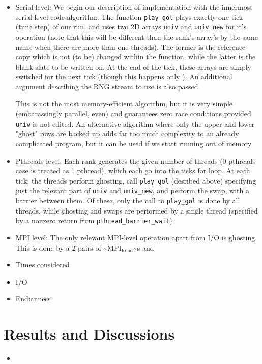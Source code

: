 \documentclass[letter,11pt]{article}
\begin{document}
\begin{itemize}
\item Serial level: We begin our description of implementation with the innermost serial level code algorithm. The function \verb~play_gol~ plays exactly one tick (time step) of our run, and uses two 2D arrays \verb~univ~ and \verb~univ_new~ for it's operation (note that this will be different than the rank's array's by the same name when there are more than one threads). The former is the reference copy which is not (to be) changed within the function, while the latter is the blank slate to be written on. At the end of the tick, these arrays are simply switched for the next tick (though this happens only ). An additional argument describing the RNG stream to use is also passed.

This is not the most memory-efficient algorithm, but it is very simple (embarassingly parallel, even) and guarantees zero race conditions provided \verb~univ~ is not edited. An alternative algorithm where only the upper and lower "ghost" rows are backed up adds far too much complexity to an already complicated program, but it can be used if we start running out of memory.
\item Pthreads level: Each rank generates the given number of threads (0 pthreads case is treated as 1 pthread), which each go into the ticks for loop. At each tick, the threads perform ghosting, call \verb~play_gol~ (desribed above) specifying just the relevant part of \verb~univ~ and \verb~univ_new~, and perform the swap, with a barrier between them. Of these, only the call to \verb~play_gol~ is done by all threads, while ghosting and swaps are performed by a single thread (specified by a nonzero return from \verb~pthread_barrier_wait~).
\item MPI level: The only relevant MPI-level operation apart from I/O is ghosting. This is done by a 2 pairs of \textasciitilde{}MPI$_{\text{Isend}}$\textasciitilde{}s and
\item Times considered
\item I/O
\item Endianness
\end{itemize}

\section{Results and Discussions}
\label{sec-3}
\begin{itemize}
\item 
\end{itemize}
\end{document}
